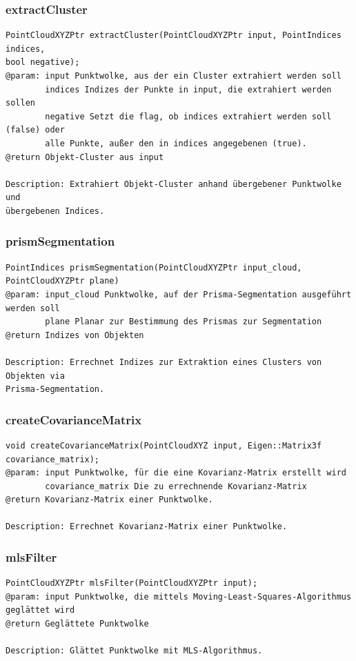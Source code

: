 \documentclass{suturo}
\begin{document}
\subsubsection{extractCluster}
\begin{verbatim}
PointCloudXYZPtr extractCluster(PointCloudXYZPtr input, PointIndices indices, 
bool negative);
@param: input Punktwolke, aus der ein Cluster extrahiert werden soll
		indices Indizes der Punkte in input, die extrahiert werden sollen
		negative Setzt die flag, ob indices extrahiert werden soll (false) oder
		alle Punkte, außer den in indices angegebenen (true).
@return Objekt-Cluster aus input

Description: Extrahiert Objekt-Cluster anhand übergebener Punktwolke und
übergebenen Indices.
\end{verbatim}\label{func:extractcluster}

\subsubsection{prismSegmentation}
\begin{verbatim}
PointIndices prismSegmentation(PointCloudXYZPtr input_cloud, PointCloudXYZPtr plane)
@param: input_cloud Punktwolke, auf der Prisma-Segmentation ausgeführt werden soll
		plane Planar zur Bestimmung des Prismas zur Segmentation
@return Indizes von Objekten

Description: Errechnet Indizes zur Extraktion eines Clusters von Objekten via
Prisma-Segmentation.
\end{verbatim}\label{func:prismsegmentation}

\subsubsection{createCovarianceMatrix}
\begin{verbatim}
void createCovarianceMatrix(PointCloudXYZ input, Eigen::Matrix3f covariance_matrix);
@param: input Punktwolke, für die eine Kovarianz-Matrix erstellt wird
		covariance_matrix Die zu errechnende Kovarianz-Matrix
@return Kovarianz-Matrix einer Punktwolke.

Description: Errechnet Kovarianz-Matrix einer Punktwolke.
\end{verbatim}\label{func:createcovariancematrix}

\subsubsection{mlsFilter}
\begin{verbatim}
PointCloudXYZPtr mlsFilter(PointCloudXYZPtr input);
@param: input Punktwolke, die mittels Moving-Least-Squares-Algorithmus geglättet wird
@return Geglättete Punktwolke

Description: Glättet Punktwolke mit MLS-Algorithmus.
\end{verbatim}\label{func:mlsfilter}
\end{document}
